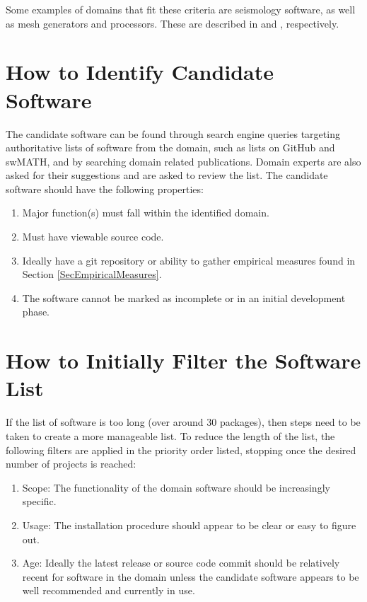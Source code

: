 \documentclass[letterpaper,cleveref]{lipics-v2019}
\theoremstyle{definition}
\begin{document}
Some examples of domains that fit these criteria are seismology software, as well as mesh generators and processors. These are described in \citep{SmithEtAl2018} and \citep{smith2016state}, respectively.


\section{How to Identify Candidate Software} \label{SecIdentifyCandSoft}
The candidate software can be found through search engine queries targeting authoritative lists of software from the domain, such as lists on GitHub and swMATH, and by searching domain related publications. Domain experts are also asked for their suggestions and are asked to review the list. The candidate software should have the following properties:

\begin{enumerate}
	\item Major function(s) must fall within the identified domain.
	\item Must have viewable source code.
	\item Ideally have a git repository or ability to gather empirical measures found in Section \ref{SecEmpiricalMeasures}.
	\item The software cannot be marked as incomplete or in an initial development phase.
\end{enumerate}

\section{How to Initially Filter the Software List} \label{SecInitialFilter}
If the list of software is too long (over around 30 packages), then steps need to be taken to create a more manageable list. To reduce the length of the list, the following filters are applied in the priority order listed, stopping once the desired number of projects is reached:

\begin{enumerate}
	\item Scope: The functionality of the domain software should be increasingly specific.
	\item Usage: The installation procedure should appear to be clear or easy to figure out.
    \item Age: Ideally the latest release or source code commit should be relatively recent for software in the domain unless the candidate software appears to be well recommended and currently in use.
\end{enumerate}
\end{document}
